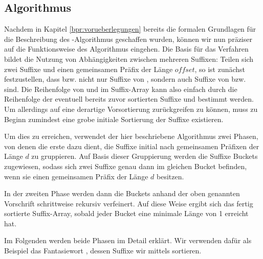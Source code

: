 \subsection{Algorithmus}
\label{bpr:algorithmus}

Nachdem in Kapitel \ref{bpr:vorueberlegungen} bereits die formalen Grundlagen für die Beschreibung des \bpr-Algorithmus geschaffen wurden, können wir nun präziser auf die Funktionsweise des Algorithmus eingehen. Die Basis für das Verfahren bildet die Nutzung von Abhängigkeiten zwischen mehreren Suffixen: Teilen sich zwei Suffixe  und  einen gemeinsamen Präfix der Länge \(\textit{offset}\), so ist zunächst festzustellen, dass  bzw.  nicht nur Suffixe von , sondern auch Suffixe von  bzw.   sind. Die Reihenfolge von  und  im Suffix-Array kann also einfach durch die Reihenfolge der eventuell bereits zuvor sortierten Suffixe  und  bestimmt werden. Um allerdings auf eine derartige Vorsortierung zurückgreifen zu können, muss zu Beginn zumindest eine grobe \glqq initiale Sortierung\grqq{} der Suffixe existieren.\par\smallskip
Um dies zu erreichen, verwendet der hier beschriebene Algorithmus zwei Phasen, von denen die erste dazu dient, die Suffixe initial nach gemeinsamen Präfixen der Länge \(d\) zu gruppieren. Auf Basis dieser Gruppierung werden die Suffixe Buckets zugewiesen, sodass sich zwei Suffixe genau dann im gleichen Bucket befinden, wenn sie einen gemeinsamen Präfix der Länge \(d\) besitzen.\par
In der zweiten Phase werden dann die Buckets anhand der oben genannten Vorschrift schrittweise rekursiv verfeinert. Auf diese Weise ergibt sich das fertig sortierte Suffix-Array, sobald jeder Bucket eine minimale Länge von 1 erreicht hat.\par\smallskip
Im Folgenden werden beide Phasen im Detail erklärt. Wir verwenden dafür als Beispiel das Fantasiewort \covfefefe, dessen Suffixe wir mittels \bpr sortieren.




